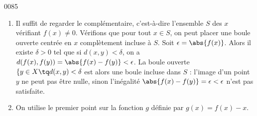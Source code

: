 
\begin{corrige}{0085}

\begin{enumerate}
\item
 Il suffit de regarder le complémentaire, c'est-à-dire l'ensemble $S$ des $x$ vérifiant $f(x) \neq 0$. Vérifions que pour tout $x\in S$, on peut placer une boule ouverte centrée en $x$ complètement incluse à $S$.  Soit $\epsilon = \abs{f(x)}$. Alors il existe $\delta > 0$ tel que si $d(x,y) < \delta$, on a $d(f(x),f(y)) = \abs{f(x) - f(y)} < \epsilon$. La boule ouverte $\{y \in X \tq d(x,y) < \delta$ est alors une boule incluse dans $S$ : l'image d'un point $y$ ne peut pas être nulle, sinon l'inégalité $\abs{f(x) - f(y)} = \epsilon < \epsilon$ n'est pas satisfaite.

\item On utilise le premier point sur la fonction $g$ définie par $g(x) = f(x) - x$.
\end{enumerate}


\end{corrige}
